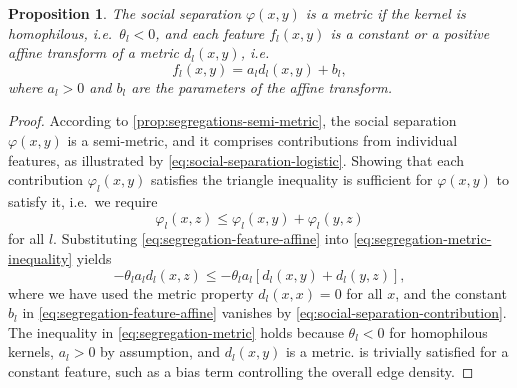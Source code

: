 \documentclass{scrartcl}
\newtheorem{prop}{Proposition}
\begin{document}
\begin{refsection}
\begin{prop}
    The social separation $\varphi(x,y)$ is a metric if the kernel is homophilous, i.e.\ $\theta_l<0$, and each feature $f_l(x, y)$ is a constant or a positive affine transform of a metric $d_l(x, y)$, i.e.
    \begin{equation}
        f_l(x, y) = a_l d_l(x, y) + b_l,\label{eq:segregation-feature-affine}
    \end{equation}
    where $a_l > 0$ and $b_l$ are the parameters of the affine transform.
\end{prop}
\begin{proof}
    According to \cref{prop:segregations-semi-metric}, the social separation $\varphi(x,y)$ is a semi-metric, and it comprises contributions from individual features, as illustrated by \cref{eq:social-separation-logistic}. Showing that each contribution $\varphi_l(x, y)$ satisfies the triangle inequality is sufficient for $\varphi(x, y)$ to satisfy it, i.e.\ we require
    \begin{equation}
        \varphi_l(x, z) \leq \varphi_l(x, y) + \varphi_l(y, z)\label{eq:segregation-metric-inequality}
    \end{equation}
    for all $l$. Substituting \cref{eq:segregation-feature-affine} into \cref{eq:segregation-metric-inequality} yields
    \begin{equation}
        -\theta_l a_l d_l(x, z)\leq -\theta_l a_l\left[d_l(x, y) + d_l(y, z)\right],\label{eq:segregation-metric}
    \end{equation}
    where we have used the metric property $d_l(x, x) = 0$ for all $x$, and the constant $b_l$ in \cref{eq:segregation-feature-affine} vanishes by \cref{eq:social-separation-contribution}. The inequality in \cref{eq:segregation-metric} holds because $\theta_l<0$ for homophilous kernels, $a_l>0$ by assumption, and $d_l(x, y)$ is a metric.  is trivially satisfied for a constant feature, such as a bias term controlling the overall edge density.
\end{proof}


\end{refsection}
\end{document}
